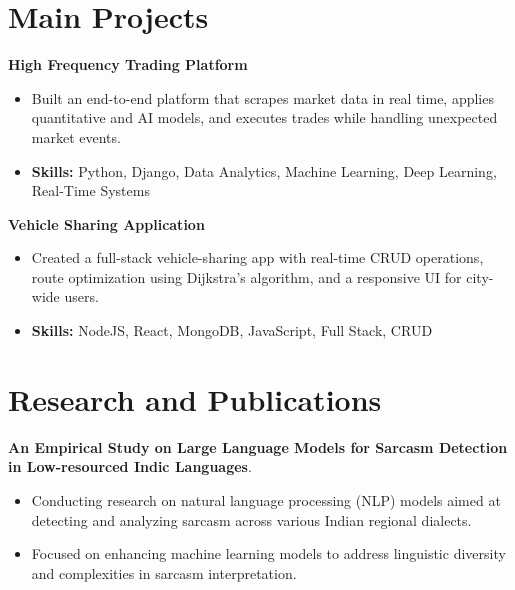 \documentclass[a4paper,11pt]{article}
\begin{document}
\section{\textbf{Main Projects}}

\vspace{1mm}
  \textbf{High Frequency Trading Platform  }
\vspace{-1.5mm} %
\begin{itemize}
  \item Built an end-to-end platform that scrapes market data in real time, applies quantitative and AI models, and executes trades while handling unexpected market events.
\vspace{-3mm}
  \item \textbf{Skills:} Python, Django, Data Analytics, Machine Learning, Deep Learning, Real-Time Systems
\end{itemize}


\vspace{1mm}
   \textbf{Vehicle Sharing Application }
\vspace{-1.5mm} %
\begin{itemize}
  \item Created a full-stack vehicle-sharing app with real-time CRUD operations, route optimization using Dijkstra's algorithm, and a responsive UI for city-wide users.
\vspace{-3mm}
  \item \textbf{Skills:} NodeJS, React, MongoDB, JavaScript, Full Stack, CRUD
\end{itemize}



\section{\textbf{Research and Publications} \hfill }
\vspace{1mm}
  \textbf{An Empirical Study on Large Language Models for Sarcasm Detection in Low-resourced Indic Languages}.
\vspace{-1mm} %
\begin{itemize}
  \item Conducting research on natural language processing (NLP) models aimed at detecting and analyzing sarcasm across various Indian regional dialects.
\vspace{-3mm}
  \item Focused on enhancing machine learning models to address linguistic diversity and complexities in sarcasm interpretation.
\end{itemize}
\end{document}
